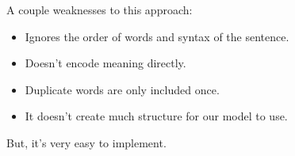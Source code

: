             A couple weaknesses to this approach:

            \begin{itemize}
                \item Ignores the order of words and syntax of the sentence.
                \item Doesn't encode meaning directly.
                \item Duplicate words are only included once.
                \item It doesn't create much structure for our model to use.
            \end{itemize}

            But, it's very easy to implement.
